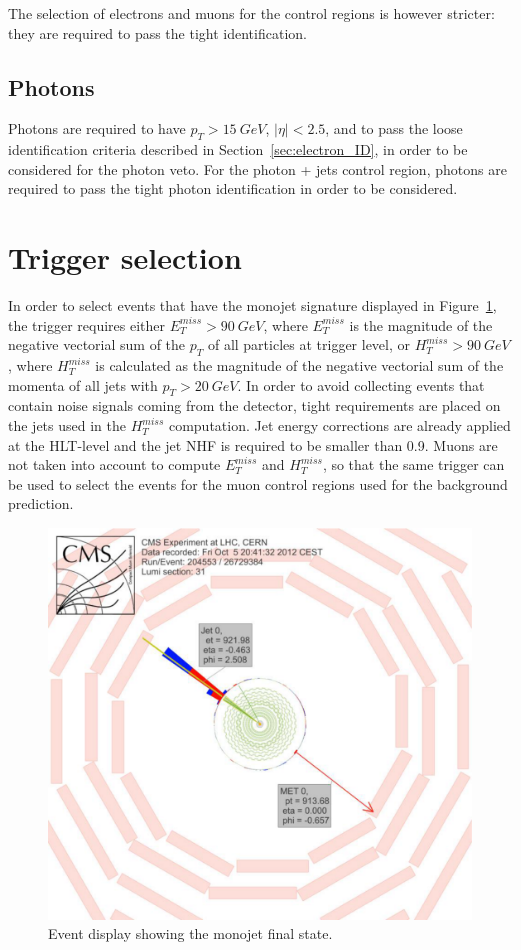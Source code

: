 The selection of electrons and muons for the control regions is however stricter: they are required to pass the tight identification.

\subsection{Photons}

Photons are required to have $p_T > \SI{15}{GeV}$, $|\eta| < 2.5$, and to pass the loose identification criteria described in Section~\ref{sec:electron_ID}, in order to be considered for the photon veto. For the photon + jets control region, photons are required to pass the tight photon identification in order to be considered.


\section{Trigger selection}
\label{sec:monojet_trigger}

In order to select events that have the monojet signature displayed in Figure~\ref{fig:monojet_display}, the trigger requires either $E_T^{miss} > \SI{90}{GeV}$, where $E_T^{miss}$ is the magnitude of the negative vectorial sum of the $p_T$ of all particles at trigger level, or $H_T^ {miss} > \SI{90}{GeV}$, where $H_T^{miss}$ is calculated as the magnitude of the negative vectorial sum of the momenta of all jets with $p_T > \SI{20}{GeV}$. In order to avoid collecting events that contain noise signals coming from the detector, tight requirements are placed on the jets used in the $H_T^{miss}$ computation. Jet energy corrections are already applied at the \ac{HLT}-level and the jet NHF is required to be smaller than 0.9. Muons are not taken into account to compute $E_T^{miss}$ and $H_T^{miss}$, so that the same trigger can be used to select the events for the muon control regions used for the background prediction.

\begin{figure}[ht]
  \centering
 \includegraphics[width=.6\textwidth]{monojet_event.pdf} 
 \caption{Event display showing the monojet final state.}
 \label{fig:monojet_display}
\end{figure}


